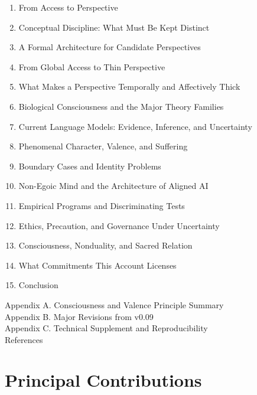 \documentclass[
  11pt,
]{article}
\providecommand{\tightlist}{%
  \setlength{\itemsep}{0pt}\setlength{\parskip}{0pt}}
\begin{document}
\begin{enumerate}
\def\labelenumi{\arabic{enumi}.}
\tightlist
\item
  From Access to Perspective\\
\item
  Conceptual Discipline: What Must Be Kept Distinct\\
\item
  A Formal Architecture for Candidate Perspectives\\
\item
  From Global Access to Thin Perspective\\
\item
  What Makes a Perspective Temporally and Affectively Thick\\
\item
  Biological Consciousness and the Major Theory Families\\
\item
  Current Language Models: Evidence, Inference, and Uncertainty\\
\item
  Phenomenal Character, Valence, and Suffering\\
\item
  Boundary Cases and Identity Problems\\
\item
  Non-Egoic Mind and the Architecture of Aligned AI\\
\item
  Empirical Programs and Discriminating Tests\\
\item
  Ethics, Precaution, and Governance Under Uncertainty\\
\item
  Consciousness, Nonduality, and Sacred Relation\\
\item
  What Commitments This Account Licenses\\
\item
  Conclusion
\end{enumerate}

Appendix A. Consciousness and Valence Principle Summary\\
Appendix B. Major Revisions from v0.09\\
Appendix C. Technical Supplement and Reproducibility\\
References

\section{Principal Contributions}\label{principal-contributions}
\end{document}
